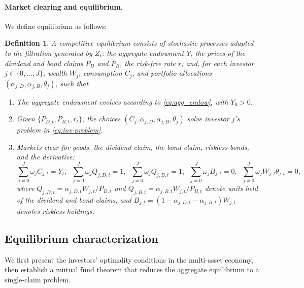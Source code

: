 \documentclass[12pt,english]{article}
\newtheorem{defn}{Definition}
\begin{document}
\paragraph{Market clearing and equilibrium.} 

We define equilibrium as follows:

\begin{defn}
A competitive equilibrium consists of stochastic processes adapted to the filtration generated by $Z_t$: the aggregate endowment $Y$, the prices of the dividend and bond claims $P_D$ and $P_B$, the risk-free rate $r$; and, for each investor $j \in \{0,\ldots,J\}$, wealth $W_j$, consumption $C_j$, and portfolio allocations $(\alpha_{j,D}, \alpha_{j,B}, \theta_j)$, such that
\begin{enumerate}[label=(\roman*)]
    \item The aggregate endowment evolves according to \eqref{eq:agg_endow}, with $Y_0 > 0$.
    \item Given $\{P_{D,t}, P_{B,t}, r_t\}$, the choices $(C_j,\alpha_{j,D},\alpha_{j,B},\theta_j)$ solve investor $j$'s problem in \eqref{eq:inv-problem}.
    \item Markets clear for goods, the dividend claim, the bond claim, riskless bonds, and the derivative:
    \begin{equation}
        \sum_{j=0}^J \omega_j C_{j,t} = Y_t, 
        \;\;
        \sum_{j=0}^J \omega_j Q_{j,D,t} = 1, 
        \;\;
        \sum_{j=0}^J \omega_j Q_{j,B,t} = 1, 
        \;\;
        \sum_{j=0}^J \omega_j B_{j,t} = 0,
        \;\;
        \sum_{j=0}^J \omega_j W_{j,t}\theta_{j,t} = 0,
    \end{equation}
    where $Q_{j,D,t} = \alpha_{j,D,t} W_{j,t} / P_{D,t}$ and $Q_{j,B,t} = \alpha_{j,B,t} W_{j,t} / P_{B,t}$ denote units held of the dividend and bond claims, and $B_{j,t} = (1-\alpha_{j,D,t}-\alpha_{j,B,t}) W_{j,t}$ denotes riskless holdings. 
\end{enumerate}
\end{defn}


\subsection{Equilibrium characterization}\label{sec:equilibrium-char}

We first present the investors' optimality conditions in the multi-asset economy, then establish a mutual fund theorem that reduces the aggregate equilibrium to a single-claim problem.
\end{document}
